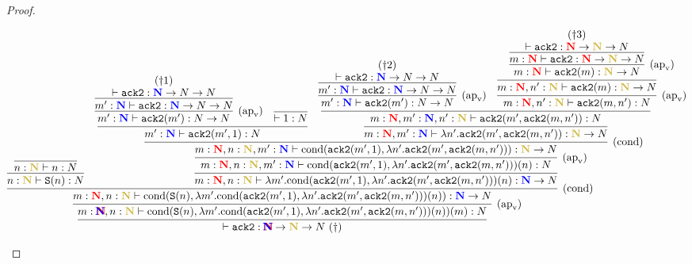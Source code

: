 \begin{proof}
\begin{flushright}
{\scriptsize
  \hspace{-3cm}
  $\infer{
    \vdash \AckB:\redblueN\to\goldN\to\N\ (\dagger)
  }{
    \infer[\Rapv]{
      m:\redblueN, n:\goldN \vdash \Cond{\Suc{n}}{\lambda m'.\Cond{\AckB(m',1)}{\lambda n'.\AckB(m',\AckB(m,n'))}(n)}(m): \N
    }{
      \infer[\Rcond]{
        m:\redN, n:\goldN \vdash \Cond{\Suc{n}}{\lambda m'.\Cond{\AckB(m',1)}{\lambda n'.\AckB(m',\AckB(m,n'))}(n)}: \blueN\to\N
      }{
        \infer{
          n:\goldN \vdash \Suc{n}: \N
        }{
          \infer{
            n:\goldN \vdash n: \N
          }{}
        }
        &
        \infer{
          m:\redN, n:\goldN \vdash \lambda m'.\Cond{\AckB(m',1)}{\lambda n'.\AckB(m',\AckB(m,n'))}(n): \blueN\to\N
        }{
          \infer[\Rapv]{
            m:\redN, n:\goldN, m':\blueN \vdash \Cond{\AckB(m',1)}{\lambda n'.\AckB(m',\AckB(m,n'))}(n): \N
          }{
            \infer[\Rcond]{
              m:\redN, n:\goldN, m':\blueN \vdash \Cond{\AckB(m',1)}{\lambda n'.\AckB(m',\AckB(m,n'))}: \goldN\to\N
            }{
              \infer{
                m':\blueN \vdash \AckB(m',1): \N
              }{
                \infer[\Rapv]{
                  m':\blueN \vdash \AckB(m'): \N\to\N
                }{
                  \infer{
                    m':\blueN \vdash \AckB: \blueN\to\N\to\N
                  }{
                    \deduce{
                      \vdash \AckB: \blueN\to\N\to\N
                    }{(\dagger1)}
                  }
                }
                &
                \infer{
                  \vdash 1:\N
                }{}
              }
              &
              \infer{
                m:\redN, m':\blueN \vdash \lambda n'.\AckB(m',\AckB(m,n')): \goldN\to\N
              }{
                \infer{
                  m:\redN, m':\blueN, n':\goldN \vdash \AckB(m',\AckB(m,n')): \N
                }{
                  \infer[\Rapv]{
                    m':\blueN \vdash \AckB(m'): \N\to\N
                  }{
                    \infer{
                      m':\blueN \vdash \AckB: \blueN\to\N\to\N
                      }{
                      \deduce{
                        \vdash \AckB: \blueN\to\N\to\N
                      }{(\dagger2)}
                    }
                  }
                  &
                  \infer[\Rapv]{
                    m:\redN, n':\goldN \vdash \AckB(m,n'): \N
                  }{
                    \infer{
                      m:\redN, n':\goldN \vdash \AckB(m): \goldN\to\N
                    }{
                      \infer[\Rapv]{
                        m:\redN \vdash \AckB(m): \goldN\to\N
                      }{
                        \infer{
                          m:\redN \vdash \AckB: \redN\to\goldN\to\N
                        }{
                          \deduce{
                            \vdash \AckB: \redN\to\goldN\to\N
                          }{(\dagger3)}
                        }
                      }
                    }
                  }
                }
              }
            }
          }
        }
      }
    }
  }$
}


\end{flushright}
\end{proof}
